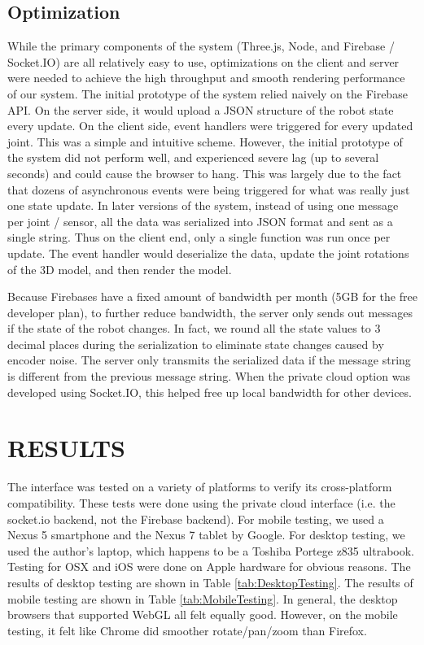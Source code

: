 \documentclass[letterpaper, 10 pt, conference]{ieee/ieeeconf}  %
\begin{document}
\subsection{Optimization}
While the primary components of the system (Three.js, Node, and Firebase / Socket.IO) are all relatively easy to use, optimizations on the client and server were needed to achieve the high throughput and smooth rendering performance of our system.
The initial prototype of the system relied naively on the Firebase API.
On the server side, it would upload a JSON structure of the robot state every update.
On the client side, event handlers were triggered for every updated joint.
This was a simple and intuitive scheme.
However, the initial prototype of the system did not perform well, and experienced severe lag (up to several seconds) and could cause the browser to hang.
This was largely due to the fact that dozens of asynchronous events were being triggered for what was really just one state update.
In later versions of the system, instead of using one message per joint / sensor, all the data was serialized into JSON format and sent as a single string.
Thus on the client end, only a single function was run once per update.
The event handler would deserialize the data, update the joint rotations of the 3D model, and then render the model.

Because Firebases have a fixed amount of bandwidth per month (5GB for the free developer plan), to further reduce bandwidth, the server only sends out messages if the state of the robot changes.
In fact, we round all the state values to 3 decimal places during the serialization to eliminate state changes caused by encoder noise.
The server only transmits the serialized data if the message string is different from the previous message string.
When the private cloud option was developed using Socket.IO, this helped free up local bandwidth for other devices.

\section{RESULTS}
The interface was tested on a variety of platforms to verify its cross-platform compatibility.
These tests were done using the private cloud interface (i.e. the socket.io backend, not the Firebase backend).
For mobile testing, we used a Nexus 5 smartphone and the Nexus 7 tablet by Google.
For desktop testing, we used the author's laptop, which happens to be a Toshiba Portege z835 ultrabook.
Testing for OSX and iOS were done on Apple hardware for obvious reasons.
The results of desktop testing are shown in Table \ref{tab:DesktopTesting}.
The results of mobile testing are shown in Table \ref{tab:MobileTesting}.
In general, the desktop browsers that supported WebGL all felt equally good.
However, on the mobile testing, it felt like Chrome did smoother rotate/pan/zoom than Firefox.
\end{document}
